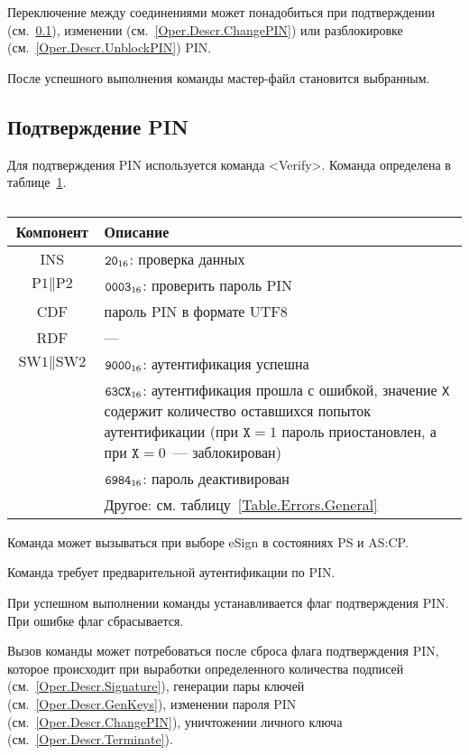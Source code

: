 Переключение между соединениями может понадобиться
при подтверждении (см.~\ref{Oper.Descr.VerifyPIN}), 
изменении (см.~\ref{Oper.Descr.ChangePIN})
или разблокировке (см.~\ref{Oper.Descr.UnblockPIN}) PIN.

После успешного выполнения команды мастер-файл становится выбранным. 

\subsection{Подтверждение PIN}
\label{Oper.Descr.VerifyPIN}

Для подтверждения PIN используется команда <Verify>. 
Команда определена в таблице~\ref{Table.Oper.VerifyPINCmd}.

\begin{table}[hbt]
\caption{}\label{Table.Oper.VerifyPINCmd}
\begin{tabular}{|c|p{14cm}|}
\hline
Компонент & Описание \\
\hline
\hline
INS & $\texttt{20}_{16}$: проверка данных\\
\hline
$\text{P1} \parallel \text{P2}$ & $\texttt{0003}_{16}$: 
проверить пароль PIN\\
\hline
CDF & пароль PIN в формате UTF8 \\
\hline 
\hline
RDF &  --- \\
\hline
$\text{SW1} \parallel \text{SW2}$ & $\texttt{9000}_{16}$: аутентификация успешна\\
\cline{2-2}
 & $\texttt{63CX}_{16}$: аутентификация прошла с ошибкой, 
значение \texttt{X} содержит количество оставшихся попыток аутентификации (при 
$\texttt{X} = 1$ пароль приостановлен, а при $\texttt{X} = 0$~--- 
заблокирован)\\ 
\cline{2-2}
& $\texttt{6984}_{16}$: пароль деактивирован \\
\cline{2-2}
 & Другое: см. таблицу~\ref{Table.Errors.General} \\
\hline
\end{tabular}
\end{table}

Команда может вызываться при выборе eSign в состояниях PS и AS:CP.

Команда требует предварительной аутентификации по PIN.

При успешном выполнении команды устанавливается флаг подтверждения PIN. При 
ошибке флаг сбрасывается. 

Вызов команды может потребоваться после сброса флага подтверждения PIN, 
которое происходит при выработки определенного количества подписей 
(см.~\ref{Oper.Descr.Signature}),
генерации пары ключей (см.~\ref{Oper.Descr.GenKeys}),
изменении пароля PIN (см.~\ref{Oper.Descr.ChangePIN}),
уничтожении личного ключа (см.~\ref{Oper.Descr.Terminate}).


